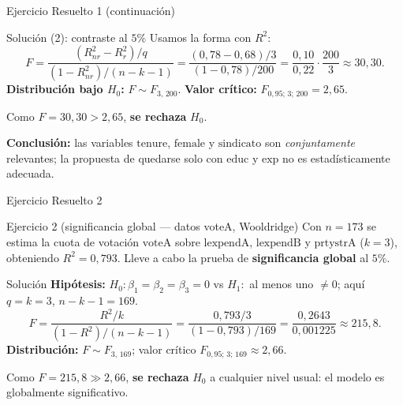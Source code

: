 \documentclass{beamer}
\begin{document}
\begin{frame}{Ejercicio Resuelto 1 (continuación)}
\begin{exampleblock}{Solución (2): contraste al $5\%$}
Usamos la forma con $R^2$:
\[
   F = \frac{(R^2_{nr}-R^2_r)/q}{(1-R^2_{nr})/(n-k-1)}
     = \frac{(0{,}78-0{,}68)/3}{(1-0{,}78)/200}
     = \frac{0{,}10}{0{,}22}\cdot\frac{200}{3} \approx 30{,}30.
\]
\textbf{Distribución bajo $H_0$:} $F \sim F_{3,\,200}$. \textbf{Valor crítico:} $F_{0{,}95;\,3;\,200}=2{,}65$.

\medskip
Como $F = 30{,}30 > 2{,}65$, \textbf{se rechaza} $H_0$.

\medskip
\textbf{Conclusión:} las variables $\text{tenure}$, $\text{female}$ y $\text{sindicato}$ son \emph{conjuntamente} relevantes; la propuesta de quedarse solo con $\text{educ}$ y $\text{exp}$ no es estadísticamente adecuada.
\end{exampleblock}
\end{frame}

\begin{frame}{Ejercicio Resuelto 2}
\begin{block}{Ejercicio 2 (significancia global — datos voteA, Wooldridge)}
Con $n=173$ se estima la cuota de votación $\text{voteA}$ sobre $\text{lexpendA}$, $\text{lexpendB}$ y $\text{prtystrA}$ ($k=3$), obteniendo $R^2=0{,}793$. Lleve a cabo la prueba de \textbf{significancia global} al $5\%$.
\end{block}

\pause

\begin{exampleblock}{Solución}
\textbf{Hipótesis:} $H_0:\beta_1=\beta_2=\beta_3=0$ vs $H_1:$ al menos uno $\neq 0$; aquí $q=k=3$, $n-k-1=169$.
\[
   F = \frac{R^2/k}{(1-R^2)/(n-k-1)} = \frac{0{,}793/3}{(1-0{,}793)/169} = \frac{0{,}2643}{0{,}001225} \approx 215{,}8.
\]
\textbf{Distribución:} $F\sim F_{3,\,169}$; valor crítico $F_{0{,}95;\,3;\,169}\approx 2{,}66$.

\medskip
Como $F=215{,}8 \gg 2{,}66$, \textbf{se rechaza} $H_0$ a cualquier nivel usual: el modelo es globalmente significativo.
\end{exampleblock}
\end{frame}
\end{document}
